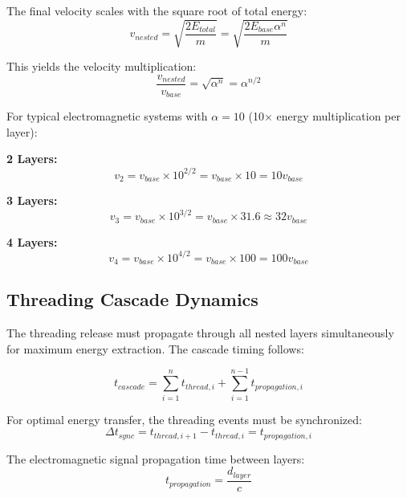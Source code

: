 \documentclass[12pt,a4paper]{article}
\begin{document}
The final velocity scales with the square root of total energy:
\begin{equation}
v_{nested} = \sqrt{\frac{2E_{total}}{m}} = \sqrt{\frac{2E_{base}\alpha^n}{m}}
\end{equation}

This yields the velocity multiplication:
\begin{equation}
\frac{v_{nested}}{v_{base}} = \sqrt{\alpha^n} = \alpha^{n/2}
\end{equation}

For typical electromagnetic systems with $\alpha = 10$ (10× energy multiplication per layer):

\textbf{2 Layers:}
\begin{equation}
v_2 = v_{base} \times 10^{2/2} = v_{base} \times 10 = 10v_{base}
\end{equation}

\textbf{3 Layers:}
\begin{equation}
v_3 = v_{base} \times 10^{3/2} = v_{base} \times 31.6 \approx 32v_{base}
\end{equation}

\textbf{4 Layers:}
\begin{equation}
v_4 = v_{base} \times 10^{4/2} = v_{base} \times 100 = 100v_{base}
\end{equation}

\subsection{Threading Cascade Dynamics}

The threading release must propagate through all nested layers simultaneously for maximum energy extraction. The cascade timing follows:

\begin{equation}
t_{cascade} = \sum_{i=1}^{n} t_{thread,i} + \sum_{i=1}^{n-1} t_{propagation,i}
\end{equation}

For optimal energy transfer, the threading events must be synchronized:
\begin{equation}
\Delta t_{sync} = t_{thread,i+1} - t_{thread,i} = t_{propagation,i}
\end{equation}

The electromagnetic signal propagation time between layers:
\begin{equation}
t_{propagation} = \frac{d_{layer}}{c}
\end{equation}
\end{document}
